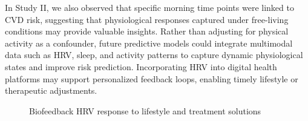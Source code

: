 \documentclass[
  a4paper,
  headsepline=true,
  open=any]{scrbook}
\begin{document}
In Study II, we also observed that specific morning time points were
linked to CVD risk, suggesting that physiological responses captured
under free-living conditions may provide valuable insights. Rather than
adjusting for physical activity as a confounder, future predictive
models could integrate multimodal data such as HRV, sleep, and activity
patterns to capture dynamic physiological states and improve risk
prediction. Incorporating HRV into digital health platforms may support
personalized feedback loops, enabling timely lifestyle or therapeutic
adjustments.

\begin{figure}

\begin{minipage}[t]{\linewidth}

{\centering 


\caption{Biofeedback HRV response to lifestyle and treatment solutions}

}

\end{minipage}%

\end{figure}
\end{document}
